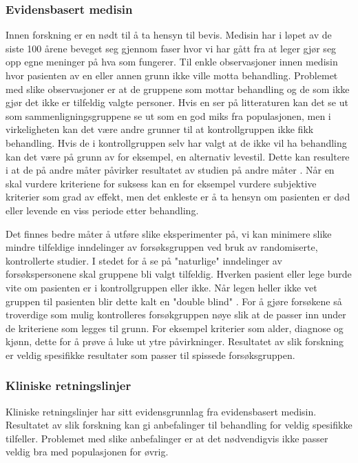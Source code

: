 \subsubsection{Evidensbasert medisin}
Innen forskning er en nødt til å ta hensyn til bevis. Medisin har i løpet av de siste 100 årene beveget seg gjennom faser hvor vi har gått fra at leger gjør seg opp egne meninger på hva som fungerer. Til enkle observasjoner innen medisin hvor pasienten av en eller annen grunn ikke ville motta behandling. Problemet med slike observasjoner er at de gruppene som mottar behandling og de som ikke gjør det ikke er tilfeldig valgte personer. Hvis en ser på litteraturen kan det se ut som sammenligningsgruppene se ut som en god miks fra populasjonen, men i virkeligheten kan det være andre grunner til at kontrollgruppen ikke fikk behandling. Hvis de i kontrollgruppen selv har valgt at de ikke vil ha behandling kan det være på grunn av for eksempel, en alternativ levestil. Dette kan resultere i at de på andre måter påvirker resultatet av studien på andre måter \citep[s.20-21]{cochrane1972}. Når en skal vurdere kriteriene for suksess kan en for eksempel vurdere subjektive kriterier som grad av effekt, men det enkleste er å ta hensyn om pasienten er død eller levende en viss periode etter behandling.

Det finnes bedre måter å utføre slike eksperimenter på, vi kan minimere slike mindre tilfeldige inndelinger av forsøksgruppen ved bruk av randomiserte, kontrollerte studier. I stedet for å se på "naturlige" inndelinger av forsøkspersonene skal gruppene bli valgt tilfeldig. Hverken pasient eller lege burde vite om pasienten er i kontrollgruppen eller ikke. Når legen heller ikke vet gruppen til pasienten blir dette kalt en "double blind" \citep[s.22-s23]{cochrane1972}. For å gjøre forsøkene så troverdige som mulig kontrolleres forsøkgruppen nøye slik at de passer inn under de kriteriene som legges til grunn. For eksempel kriterier som alder, diagnose og kjønn, dette for å prøve å luke ut ytre påvirkninger. Resultatet av slik forskning er veldig spesifikke resultater som passer til spissede forsøksgruppen.


\subsubsection{Kliniske retningslinjer}
Kliniske retningslinjer har sitt evidensgrunnlag fra evidensbasert medisin. Resultatet av slik forskning kan gi anbefalinger til behandling for veldig spesifikke tilfeller. Problemet med slike anbefalinger er at det nødvendigvis ikke passer veldig bra med populasjonen for øvrig.

